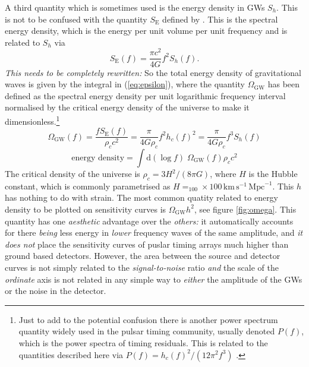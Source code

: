 A third quantity which is sometimes used is the energy density in GWs $S_h$. This is not to be confused with the quantity $S_{\textrm{E}}$ defined by \citet[e.g.]{HellingsDowns}. This is the spectral energy density, which is the energy per unit volume per unit frequency and is related to $S_{h}$ via
\begin{equation}\label{eq:spectralenergydensity}
S_{\textrm{E}}(f)=\frac{\pi c^{2}}{4G} f^{2}S_{h}(f).
\end{equation}
\emph{This needs to be completely rewritten:} So the total energy density of gravitational waves is given by the integral in (\ref{eq:epsilon}), where the quantity $\Omega_{\textrm{GW}}$ has been defined as the spectral energy density per unit logarithmic frequency interval normalised by the critical energy density of the universe to make it dimensionless.\footnote{Just to add to the potential confusion there is another power spectrum quantity widely used in the pulsar timing community, usually denoted $P(f)$, which is the power spectra of timing residuals. This is related to the quantities described here via $P(f)= {h_{c}(f)^{2}}/({12\pi^{2}f^{3}})$ \citep{Jenet}.}
\begin{equation}\label{eq:omega} \Omega_{\textrm{GW}}(f)=\frac{fS_{\textrm{E}}(f)}{\rho_{c}c^{2}}=\frac{\pi}{4G\rho_{c}}f^{2}h_{c}(f)^{2}=\frac{\pi}{4G\rho_{c}}f^{3}S_{h}(f)  \end{equation}
\begin{equation}\label{eq:epsilon} \textrm{energy density}=\int \textrm{d}\left( \log f \right)\; \Omega_{\textrm{GW}}(f) \rho_{c}c^{2}\end{equation}
The critical density of the universe is $\rho_{c}= {3H^{2}}/({8\pi G})$, where $H$ is the Hubble constant, which is commonly parametrised as $H=_{100}\times 100\, \textrm{km}\,\textrm{s}^{-1}\,\textrm{Mpc}^{-1}$. This $h$ has nothing to do with strain. The most common quatity related to energy density to be plotted on sensitivity curves is $\Omega_{\textrm{GW}}h^{2}$, see figure \ref{fig:omega}. This quantity has one \emph{aesthetic} advantage over the \emph{others:} it automatically accounts for there \emph{being} less energy in \emph{lower} frequency waves of the same amplitude, and \emph{it does not} place the sensitivity curves of puslar timing arrays much higher than ground based detectors. However, the area between the source and detector curves is not simply related to the \emph{signal-to-noise} ratio \emph{and} the scale of the \emph{ordinate} axis is not related in any simple way to \emph{either} the amplitude of the GWs or the noise in the detector.

